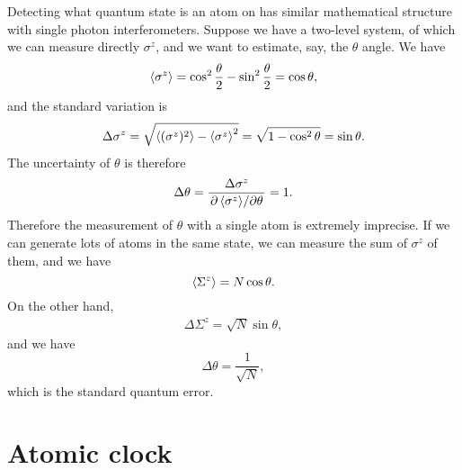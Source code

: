 \documentclass[hyperref, a4paper]{article}
\begin{document}
Detecting what quantum state is an atom on has similar mathematical structure with single photon interferometers.
Suppose we have a two-level system, of which we can measure directly $\sigma^z$, and we want to estimate, say, the $\theta$ angle.
We have
\begin{equation}
    \expval{\sigma^z} = \cos^2 \frac{\theta}{2} - \sin^2 \frac{\theta}{2} = \cos \theta,
\end{equation}
and the standard variation is 
\begin{equation}
    \Delta \sigma^z = \sqrt{\expval{(\sigma^z)^2} - \expval{\sigma^z}^2} = \sqrt{1 - \cos^2 \theta} = \sin \theta.
\end{equation}
The uncertainty of $\theta$ is therefore 
\begin{equation}
    \Delta\theta = \frac{\Delta \sigma^z}{\pdv*{\expval{\sigma^z}}{\theta}} = 1.
\end{equation}
Therefore the measurement of $\theta$ with a single atom is extremely imprecise.
If we can generate lots of atoms in the same state, we can measure the sum of $\sigma^z$ of them, and we have 
\begin{equation}
    \expval{\Sigma^z} = N \cos \theta.
\end{equation}
On the other hand, 
\begin{eqnarray}
    \Delta \Sigma^z = \sqrt{N} \sin \theta,
\end{eqnarray}
and we have 
\begin{equation}
    \Delta \theta = \frac{1}{\sqrt{N}},
\end{equation}
which is the standard quantum error.

\section{Atomic clock}
\end{document}
